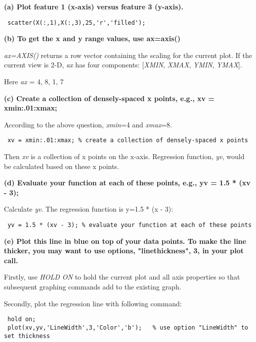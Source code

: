 \documentclass[twoside,11pt]{article}
\theoremstyle{definition}
\begin{document}
\vspace{3ex}
\textbf{(a) Plot feature 1 (x-axis) versus feature 3 (y-axis).}
\begin{lstlisting}
 scatter(X(:,1),X(:,3),25,'r','filled');
\end{lstlisting}

\vspace{3ex}
\textbf{(b) To get the x and y range values, use ax=axis()}

\textit{ax=AXIS()} returns a row vector containing the scaling for the current plot. If the current view is 2-D, \textit{ax} has four components: [\textit{XMIN}, \textit{XMAX}, \textit{YMIN}, \textit{YMAX}].

Here \textit{ax} = 4, 8, 1, 7 
       
\vspace{3ex}
\textbf{(c) Create a collection of densely-spaced x points, e.g., xv = xmin:.01:xmax;}

According to the above question, \textit{xmin}=4 and \textit{xmax}=8.
\begin{lstlisting}
 xv = xmin:.01:xmax; % create a collection of densely-spaced x points
\end{lstlisting}
Then \textit{xv} is a collection of x points on the x-axis. Regression function, \textit{yv}, would be calculated based on these x points. 

\vspace{3ex}

\textbf{(d) Evaluate your function at each of these points, e.g., yv = 1.5 * (xv - 3);}

Calculate \textit{yv}. The regression function is y=1.5 * (x - 3):
\begin{lstlisting}
 yv = 1.5 * (xv - 3); % evaluate your function at each of these points
\end{lstlisting}

\vspace{3ex}

\textbf{(e) Plot this line in blue on top of your data points. To make the line thicker, you may want to
use options, "linethickness", 3, in your plot call.}

Firstly, use \textit{HOLD ON} to hold the current plot and all axis properties so that subsequent graphing commands add to the existing graph.

Secondly, plot the regression line with following command:

\begin{lstlisting}
 hold on;
 plot(xv,yv,'LineWidth',3,'Color','b');   % use option "LineWidth" to set thickness
\end{lstlisting}
\end{document}
